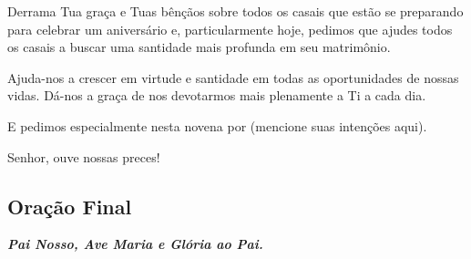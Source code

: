 \documentclass[18pt]{article}
\begin{document}
Derrama Tua graça e Tuas bênçãos sobre todos os casais que estão se preparando para celebrar um aniversário e, particularmente hoje, pedimos que ajudes todos os casais a buscar uma santidade mais profunda em seu matrimônio.  

Ajuda-nos a crescer em virtude e santidade em todas as oportunidades de nossas vidas. Dá-nos a graça de nos devotarmos mais plenamente a Ti a cada dia.  

E pedimos especialmente nesta novena por (mencione suas intenções aqui).  

Senhor, ouve nossas preces!  




\begin{center}
 \section{Oração Final}\label{sec:Oração Final}
\textbf{\textit{Pai Nosso, Ave Maria e Glória ao Pai.}}
\end{center}

\vfill


\vfill
\end{document}
